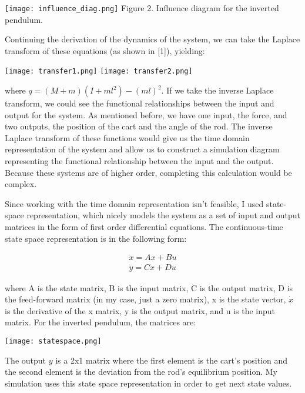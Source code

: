 \documentclass{article}
\begin{document}
\begin{center}
    \texttt{[image: influence\_diag.png]}
    Figure 2. Influence diagram for the inverted pendulum.
\end{center}

Continuing the derivation of the dynamics of the system, we can take the Laplace transform of these equations (as shown in [1]), yielding:

\begin{center}
    \texttt{[image: transfer1.png]}
    \texttt{[image: transfer2.png]}
    
\end{center}

where $q = (M + m)(I + ml^2) -(ml)^2$. If we take the inverse Laplace transform, we could see the functional relationships between the input and output for the system. As mentioned before, we have one input, the force, and two outputs, the position of the cart and the angle of the rod. The inverse Laplace transform of these functions would give us the time domain representation of the system and allow us to construct a simulation diagram representing the functional relationship between the input and the output. Because these systems are of higher order, completing this calculation would be complex. 


Since working with the time domain representation isn't feasible, I used state-space representation, which nicely models the system as a set of input and output matrices in the form of first order differential equations. The continuous-time state space representation is in the following form:

\begin{align}
    \Dot{x} = Ax + Bu \\
    y = Cx + Du
\end{align}

\noindent where A is the state matrix, B is the input matrix, C is the output matrix, D is the feed-forward matrix (in my case, just a zero matrix), x is the state vector, $\Dot{x}$ is the derivative of the x matrix, y is the output matrix, and u is the input matrix. For the inverted pendulum, the matrices are: 

\begin{center}
    \texttt{[image: statespace.png]}
\end{center}

The output $y$ is a 2x1 matrix where the first element is the cart's position and the second element is the deviation from the rod's equilibrium position. My simulation uses this state space representation in order to get next state values. 
\end{document}
